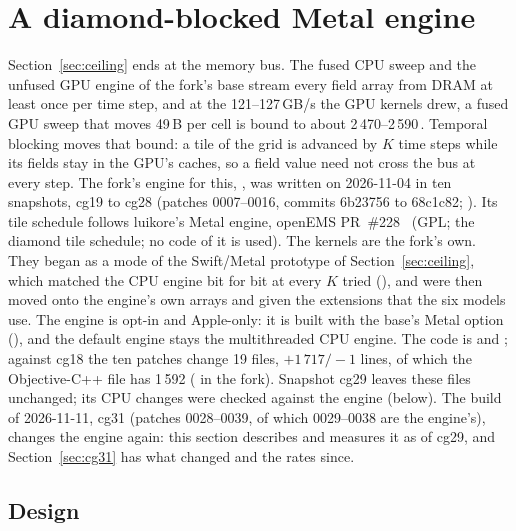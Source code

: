 \section{A diamond-blocked Metal engine}\label{sec:gpu}
Section~\ref{sec:ceiling} ends at the memory bus. The fused CPU sweep and the unfused GPU engine of the fork's base
stream every field array from DRAM at least once per time step, and at the 121--127\,GB/s the GPU kernels drew, a fused GPU sweep that
moves 49\,B per cell is bound to about 2\,470--2\,590\,\MC. Temporal blocking moves that bound: a tile of the grid is advanced by $K$
time steps while its fields stay in the GPU's caches, so a field value need not cross the bus at every step. The
fork's engine for this, , was written on 2026-11-04 in ten snapshots, cg19 to cg28
(patches 0007--0016, commits 6b23756 to 68c1c82; ). Its tile schedule follows luikore's Metal
engine, openEMS PR~\#228~\cite{luikore228} (GPL; the diamond tile schedule; no code of it is used). The kernels are
the fork's own. They began as a  mode of the Swift/Metal prototype of Section~\ref{sec:ceiling},
which matched the CPU engine bit for bit at every $K$ tried (), and were
then moved onto the engine's own arrays and given the extensions that the six models use. The engine is opt-in and
Apple-only: it is built with the base's Metal option (), and the default engine stays the
multithreaded CPU engine. The code is  and
; against cg18 the ten patches change 19 files, $+1\,717/-1$ lines, of which
the Objective-C++ file has 1\,592 ( in the fork). Snapshot cg29 leaves these
files unchanged; its CPU changes were checked against the engine (below). The build of 2026-11-11, cg31 (patches
0028--0039, of which 0029--0038 are the engine's), changes the engine again: this section describes and measures it
as of cg29, and Section~\ref{sec:cg31} has what changed and the rates since.

\subsection{Design}
